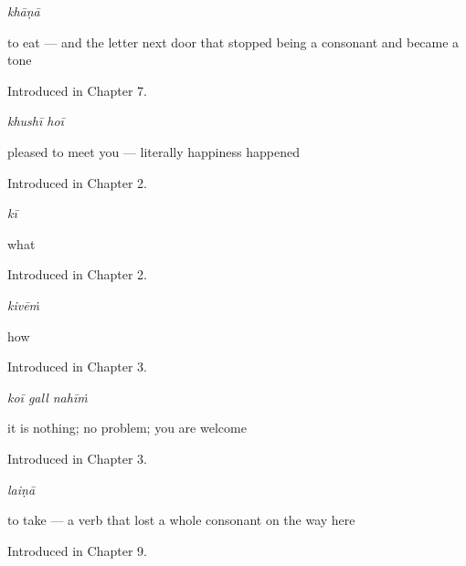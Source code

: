 \noindent\begin{minipage}[t]{\linewidth}
\raggedright
\textbf{}\enspace\emph{khāṇā}\par
\small to eat — and the letter next door that stopped being a consonant and became a tone\par
\footnotesize Introduced in Chapter 7.
\end{minipage}\par\medskip

\noindent\begin{minipage}[t]{\linewidth}
\raggedright
\textbf{ }\enspace\emph{khushī hoī}\par
\small pleased to meet you — literally happiness happened\par
\footnotesize Introduced in Chapter 2.
\end{minipage}\par\medskip

\noindent\begin{minipage}[t]{\linewidth}
\raggedright
\textbf{}\enspace\emph{kī}\par
\small what\par
\footnotesize Introduced in Chapter 2.
\end{minipage}\par\medskip

\noindent\begin{minipage}[t]{\linewidth}
\raggedright
\textbf{}\enspace\emph{kivēṁ}\par
\small how\par
\footnotesize Introduced in Chapter 3.
\end{minipage}\par\medskip

\noindent\begin{minipage}[t]{\linewidth}
\raggedright
\textbf{  }\enspace\emph{koī gall nahīṁ}\par
\small it is nothing; no problem; you are welcome\par
\footnotesize Introduced in Chapter 3.
\end{minipage}\par\medskip

\noindent\begin{minipage}[t]{\linewidth}
\raggedright
\textbf{}\enspace\emph{laiṇā}\par
\small to take — a verb that lost a whole consonant on the way here\par
\footnotesize Introduced in Chapter 9.
\end{minipage}\par\medskip

